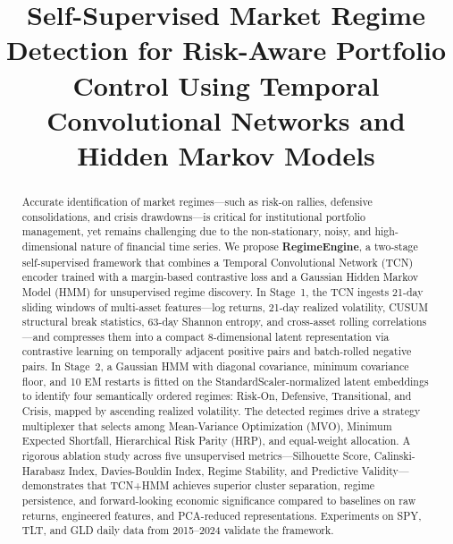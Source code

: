 \documentclass[conference, twocolumn]{IEEEtran}
\begin{document}
\title{Self-Supervised Market Regime Detection for Risk-Aware Portfolio Control Using Temporal Convolutional Networks and Hidden Markov Models}

\author{
}

\maketitle

\begin{abstract}
Accurate identification of market regimes---such as risk-on rallies, defensive consolidations, and crisis drawdowns---is critical for institutional portfolio management, yet remains challenging due to the non-stationary, noisy, and high-dimensional nature of financial time series. We propose \textbf{RegimeEngine}, a two-stage self-supervised framework that combines a Temporal Convolutional Network (TCN) encoder trained with a margin-based contrastive loss and a Gaussian Hidden Markov Model (HMM) for unsupervised regime discovery. In Stage~1, the TCN ingests 21-day sliding windows of multi-asset features---log returns, 21-day realized volatility, CUSUM structural break statistics, 63-day Shannon entropy, and cross-asset rolling correlations---and compresses them into a compact 8-dimensional latent representation via contrastive learning on temporally adjacent positive pairs and batch-rolled negative pairs. In Stage~2, a Gaussian HMM with diagonal covariance, minimum covariance floor, and 10 EM restarts is fitted on the StandardScaler-normalized latent embeddings to identify four semantically ordered regimes: Risk-On, Defensive, Transitional, and Crisis, mapped by ascending realized volatility. The detected regimes drive a strategy multiplexer that selects among Mean-Variance Optimization (MVO), Minimum Expected Shortfall, Hierarchical Risk Parity (HRP), and equal-weight allocation. A rigorous ablation study across five unsupervised metrics---Silhouette Score, Calinski-Harabasz Index, Davies-Bouldin Index, Regime Stability, and Predictive Validity---demonstrates that TCN+HMM achieves superior cluster separation, regime persistence, and forward-looking economic significance compared to baselines on raw returns, engineered features, and PCA-reduced representations. Experiments on SPY, TLT, and GLD daily data from 2015--2024 validate the framework.
\end{abstract}
\end{document}
